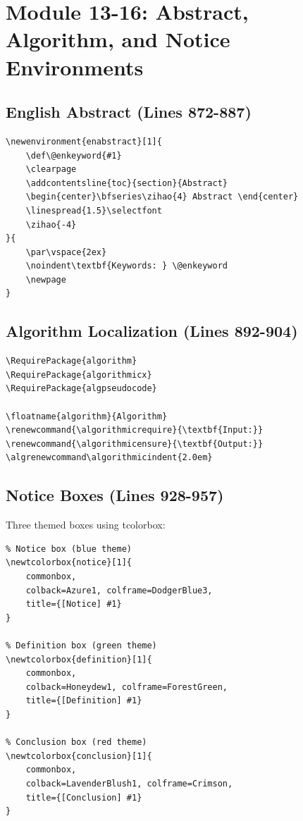 \documentclass[linux]{hustreport}
\begin{document}
\newpage
\section{Module 13-16: Abstract, Algorithm, and Notice Environments}

\subsection{English Abstract (Lines 872-887)}

\begin{verbatim}
\newenvironment{enabstract}[1]{
    \def\@enkeyword{#1}
    \clearpage
    \addcontentsline{toc}{section}{Abstract}
    \begin{center}\bfseries\zihao{4} Abstract \end{center}
    \linespread{1.5}\selectfont
    \zihao{-4}
}{
    \par\vspace{2ex}
    \noindent\textbf{Keywords: } \@enkeyword
    \newpage
}
\end{verbatim}

\subsection{Algorithm Localization (Lines 892-904)}

\begin{verbatim}
\RequirePackage{algorithm}
\RequirePackage{algorithmicx}
\RequirePackage{algpseudocode}

\floatname{algorithm}{Algorithm}
\renewcommand{\algorithmicrequire}{\textbf{Input:}}
\renewcommand{\algorithmicensure}{\textbf{Output:}}
\algrenewcommand\algorithmicindent{2.0em}
\end{verbatim}

\subsection{Notice Boxes (Lines 928-957)}

Three themed boxes using tcolorbox:

\begin{verbatim}
% Notice box (blue theme)
\newtcolorbox{notice}[1]{
    commonbox,
    colback=Azure1, colframe=DodgerBlue3,
    title={[Notice] #1}
}

% Definition box (green theme)
\newtcolorbox{definition}[1]{
    commonbox,
    colback=Honeydew1, colframe=ForestGreen,
    title={[Definition] #1}
}

% Conclusion box (red theme)
\newtcolorbox{conclusion}[1]{
    commonbox,
    colback=LavenderBlush1, colframe=Crimson,
    title={[Conclusion] #1}
}
\end{verbatim}
\end{document}
